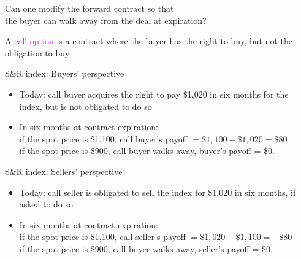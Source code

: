 \def\mySecNum{2.2}
\mySection{\mySecNum~Call options}
\begin{frame}[fragile,t]
\begin{center}
	Can one modify the forward contract so that\\
	the buyer can walk away from the deal at expiration?
\end{center}
\bigskip
\mySeparateLine
\bigskip

\begin{mydefinition}
	A \textcolor{magenta}{call option} is a contract where the buyer has the right to buy, but not the obligation to buy.
\end{mydefinition}
\bigskip

\end{frame}
\begin{frame}[fragile,t]
	\begin{myexample}
		S\&R index: Buyers' perspective
		\begin{itemize}
			\item Today: call buyer acquires the right to pay \$1,020 in six months for the index, but is not obligated to do so
			\item In six months at contract expiration: \\
				if the spot price is \$1,100, call buyer’s payoff $=\$1,100-\$1,020=\$80$\\
				if the spot price is \$900, call buyer walks away, buyer’s payoff = \$0.
		\end{itemize}
	\end{myexample}

	\pause
	\bigskip
	\mySeparateLine
	\bigskip

	\begin{myexample}
		S\&R index: Sellers' perspective
		\begin{itemize}
			\item Today: call seller is obligated to sell the index for \$1,020 in six months, if asked to do so
			\item In six months at contract expiration: \\
				if the spot price is \$1,100, call seller’s payoff $=\$1,020-\$1,100=-\$80$\\
				if the spot price is \$900, call buyer walks away, seller’s payoff = \$0.
		\end{itemize}
	\end{myexample}
\end{frame}

